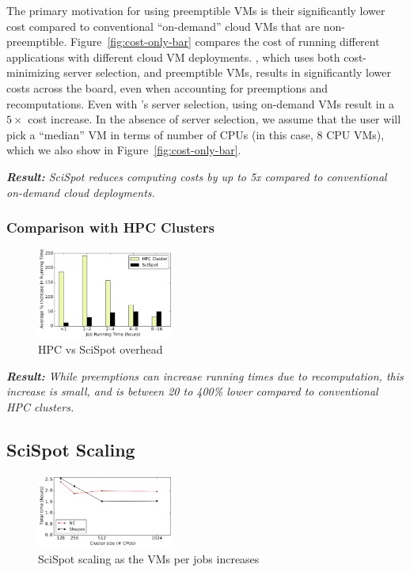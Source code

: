 The primary motivation for using preemptible VMs is their significantly lower cost compared to conventional ``on-demand'' cloud VMs that are non-preemptible. 
Figure~\ref{fig:cost-only-bar} compares the cost of running different applications with different cloud VM deployments.
\sysname, which uses both cost-minimizing server selection, and preemptible VMs, results in significantly lower costs across the board, even when accounting for preemptions and recomputations. 
Even with \sysname's server selection, using on-demand VMs result in a $5\times$ cost increase.
In the absence of server selection, we assume that the user will pick a ``median'' VM in terms of number of CPUs (in this case, 8 CPU VMs), which we also show in Figure~\ref{fig:cost-only-bar}. 


\noindent \emph{ \textbf{Result:} SciSpot reduces computing costs by up to 5x compared to conventional on-demand cloud deployments.}




\subsubsection{Comparison with HPC Clusters}




\begin{figure}[t]
  \centering 
  \includegraphics[width=0.4\textwidth]{../graphs/hpc-vs-scispot.pdf}
  \caption{HPC vs SciSpot overhead}
  \label{fig:hpc-vs-scispot}

\end{figure}

\noindent \emph{ \textbf{Result:} While preemptions can increase running times due to recomputation, this increase is small, and is between 20 to 400\% lower compared to conventional HPC clusters. }


\subsection{SciSpot Scaling}


\begin{figure}
  \includegraphics[width=0.4\textwidth]{../graphs/vm-per-job-scaling.pdf}
  \caption{SciSpot scaling as the VMs per jobs increases}
  \label{fig:vm-per-job-scaling}
\end{figure}


